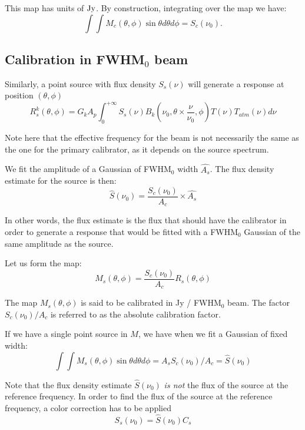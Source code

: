 This map has units of $\rm Jy$. By construction, integrating over the map we have:
\begin{equation}
\int\int M_{c}(\theta, \phi) \sin \theta d\theta d\phi = S_{c}(\nu_{0}).
\end{equation}



\subsection{Calibration in FWHM$_{0}$ beam}
\label{se:flux_density_equation}

Similarly, a point source with flux density $S_{s}(\nu)$ will
generate a response at position $(\theta, \phi)$
\begin{equation}
R_{s}^{k}(\theta, \phi) =  G_{k} A_{p}  \int_{0}^{+\infty}
S_{s}(\nu) B_{k}(\nu_{0}, \theta \times \frac{\nu}{\nu_{0}},
\phi) T(\nu) T_{atm}(\nu) d\nu
\label{eq:pointsourceresponse}
\end{equation}

Note here that the effective frequency for the beam is not necessarily
the same as the one for the primary calibrator, as it depends on the
source spectrum.

We fit the amplitude of a Gaussian of FWHM$_0$ width $\hat{A_{s}}$.
The flux density estimate for the source is then:
\begin{equation}
\hat{S}(\nu_{0})  = \frac{S_{c}(\nu_{0})}{A_{c}} \times \hat{A_{s}}
\label{eq:pointsourcephot}
\end{equation}


In other words, the flux estimate is the flux that should have the
calibrator in order to generate a response that would be fitted with a FWHM$_0$
Gaussian of the same amplitude as the source.

Let us form the map:
\begin{equation}
M_{s}(\theta, \phi) = \frac{S_{c} (\nu_{0})}{A_{c}}  R_{s}(\theta,
\phi)
\label{eq:pointsourcemap}
\end{equation}

The map $M_{s}(\theta, \phi)$ is said to be calibrated in Jy / FWHM$_{0}$
beam. The factor $S_{c} (\nu_{0})/A_{c}$ is referred to as the
absolute calibration factor.

If we have a single point source in $M$, we have when we fit a Gaussian
of fixed width:
\begin{equation}
\int \int M_{s}(\theta, \phi) \sin \theta d\theta d\phi = \hat{A_{s}}  S_{c} (\nu_{0}) /
A_{c} = \hat{S}(\nu_{0})
\end{equation}

Note that the flux density estimate $\hat{S}(\nu_{0})$ {\em is not} the flux of the source at the
reference frequency. In order to find the flux of the source at the
reference frequency, a color correction has to be applied
\begin{equation}
S_{s}(\nu_{0}) = \hat{S}(\nu_{0})  C_{s}
\end{equation}




